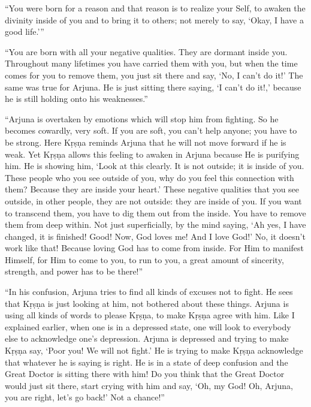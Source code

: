 \documentclass[12pt, twoside, openright]{memoir}
\begin{document}
\enquote{You were born for a reason and that reason is to realize your Self, to awaken the divinity inside of you and to bring it to others; not merely to say, \enquote{Okay, I have a good life.}}

\enquote{You are born with all your negative qualities. They are dormant inside you. Throughout many lifetimes you have carried them with you, but when the time comes for you to remove them, you just sit there and say, \enquote{No, I can’t do it!} The same was true for Arjuna. He is just sitting there saying, \enquote{I can’t do it!,} because he is still holding onto his weaknesses.}

\enquote{Arjuna is overtaken by emotions which will stop him from fighting. So he becomes cowardly, very soft. If you are soft, you can’t help anyone; you have to be strong. Here Kṛṣṇa reminds Arjuna that he will not move forward if he is weak. Yet Kṛṣṇa allows this feeling to awaken in Arjuna because He is purifying him. He is showing him, \enquote{Look at this clearly. It is not outside; it is inside of you. These people who you see outside of you, why do you feel this connection with them? Because they are inside your heart.} These negative qualities that you see outside, in other people, they are not outside: they are inside of you. If you want to transcend them, you have to dig them out from the inside. You have to remove them from deep within. Not just superficially, by the mind saying, \enquote{Ah yes, I have changed, it is finished! Good! Now, God loves me! And I love God!} No, it doesn’t work like that! Because loving God has to come from inside. For Him to manifest Himself, for Him to come to you, to run to you, a great amount of sincerity, strength, and power has to be there!}

\enquote{In his confusion, Arjuna tries to find all kinds of excuses not to fight. He sees that Kṛṣṇa is just looking at him, not bothered about these things. Arjuna is using all kinds of words to please Kṛṣṇa, to make Kṛṣṇa agree with him. Like I explained earlier, when one is in a depressed state, one will look to everybody else to acknowledge one’s depression. Arjuna is depressed and trying to make Kṛṣṇa say, \enquote{Poor you! We will not fight.} He is trying to make Kṛṣṇa acknowledge that whatever he is saying is right. He is in a state of deep confusion and the Great Doctor is sitting there with him! Do you think that the Great Doctor would just sit there, start crying with him and say, \enquote{Oh, my God! Oh, Arjuna, you are right, let’s go back!} Not a chance!}
\end{document}
